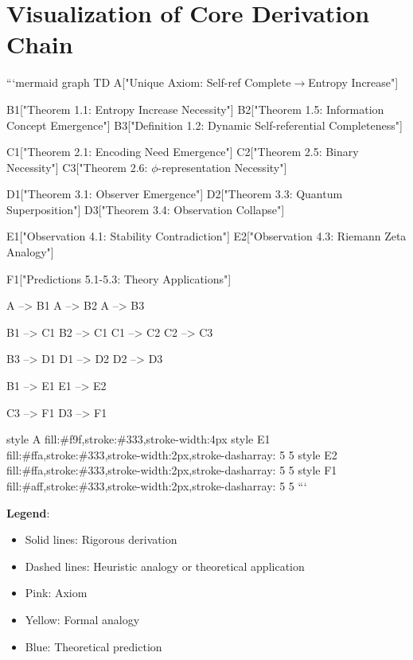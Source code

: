 
\section{Visualization of Core Derivation Chain}

```mermaid
graph TD
    A["Unique Axiom: Self-ref Complete$\rightarrow$Entropy Increase"] 
    
    B1["Theorem 1.1: Entropy Increase Necessity"]
    B2["Theorem 1.5: Information Concept Emergence"]
    B3["Definition 1.2: Dynamic Self-referential Completeness"]
    
    C1["Theorem 2.1: Encoding Need Emergence"]
    C2["Theorem 2.5: Binary Necessity"]
    C3["Theorem 2.6: $\phi$-representation Necessity"]
    
    D1["Theorem 3.1: Observer Emergence"]
    D2["Theorem 3.3: Quantum Superposition"]
    D3["Theorem 3.4: Observation Collapse"]
    
    E1["Observation 4.1: Stability Contradiction"]
    E2["Observation 4.3: Riemann Zeta Analogy"]
    
    F1["Predictions 5.1-5.3: Theory Applications"]
    
    A --> B1
    A --> B2
    A --> B3
    
    B1 --> C1
    B2 --> C1
    C1 --> C2
    C2 --> C3
    
    B3 --> D1
    D1 --> D2
    D2 --> D3
    
    B1 --> E1
    E1 --> E2
    
    C3 --> F1
    D3 --> F1
    
    style A fill:\#f9f,stroke:\#333,stroke-width:4px
    style E1 fill:\#ffa,stroke:\#333,stroke-width:2px,stroke-dasharray: 5 5
    style E2 fill:\#ffa,stroke:\#333,stroke-width:2px,stroke-dasharray: 5 5
    style F1 fill:\#aff,stroke:\#333,stroke-width:2px,stroke-dasharray: 5 5
```

\textbf{Legend}:
\begin{itemize}
\item Solid lines: Rigorous derivation
\item Dashed lines: Heuristic analogy or theoretical application
\item Pink: Axiom
\item Yellow: Formal analogy
\item Blue: Theoretical prediction
\end{itemize}

